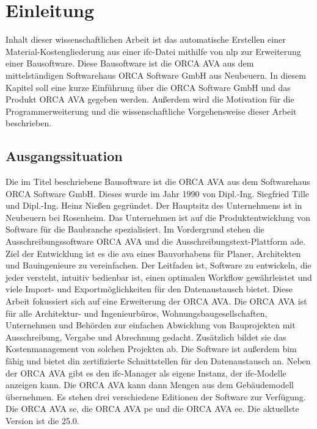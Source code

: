 \chapter{Einleitung}
\label{c:intro}

Inhalt dieser wissenschaftlichen Arbeit ist das automatische Erstellen einer Material-Kostengliederung aus einer \ac{ifc}-Datei mithilfe von \ac{nlp} zur Erweiterung einer Bausoftware. Diese Bausoftware ist die ORCA AVA aus dem mittelständigen Softwarehaus \glqq ORCA Software GmbH\grqq{} aus Neubeuern. 
In diesem Kapitel soll eine kurze Einführung über die \glqq ORCA Software GmbH\grqq{} und das Produkt  ORCA AVA gegeben werden. Außerdem wird die Motivation für die Programmerweiterung und die wissenschaftliche Vorgehensweise dieser Arbeit beschrieben.

\section{Ausgangssituation}
\label{c:intro:start}

Die im Titel beschriebene Bausoftware ist die ORCA AVA aus dem Softwarehaus \glqq ORCA Software GmbH\grqq{}. Dieses wurde im Jahr 1990 von Dipl.-Ing. Siegfried Tille und Dipl.-Ing. Heinz Nießen gegründet. Der Hauptsitz des Unternehmens ist in Neubeuern bei Rosenheim. Das Unternehmen ist auf die Produktentwicklung von Software für die Baubranche spezialisiert. Im Vordergrund stehen die Ausschreibungssoftware ORCA AVA und die Ausschreibungstext-Plattform \ac{ade}. Ziel der Entwicklung ist es die \ac{ava} eines Bauvorhabens für Planer, Architekten und Bauingenieure zu vereinfachen. Der Leitfaden ist, Software zu entwickeln, die jeder versteht, intuitiv bedienbar ist, einen optimalen Workflow gewährleistet und viele Import- und Exportmöglichkeiten für den Datenaustausch bietet.
Diese Arbeit fokussiert sich auf eine Erweiterung der ORCA AVA. Die ORCA AVA ist für alle Architektur- und Ingenieurbüros, Wohnungsbaugesellschaften, Unternehmen und Behörden zur einfachen Abwicklung von Bauprojekten mit Ausschreibung, Vergabe und Abrechnung gedacht. Zusätzlich bildet sie das Kostenmanagement von solchen Projekten ab. Die Software ist außerdem \ac{bim} fähig und bietet \ac{din} zertifizierte Schnittstellen für den Datenaustausch an. Neben der ORCA AVA gibt es den \ac{ifc}-Manager als eigene Instanz, der \ac{ifc}-Modelle anzeigen kann. Die ORCA AVA kann dann Mengen aus dem Gebäudemodell übernehmen.
Es stehen drei verschiedene Editionen der Software zur Verfügung. Die ORCA AVA \ac{se}, die ORCA AVA \ac{pe} und die ORCA AVA \ac{ee}. Die aktuellste Version ist die 25.0.

